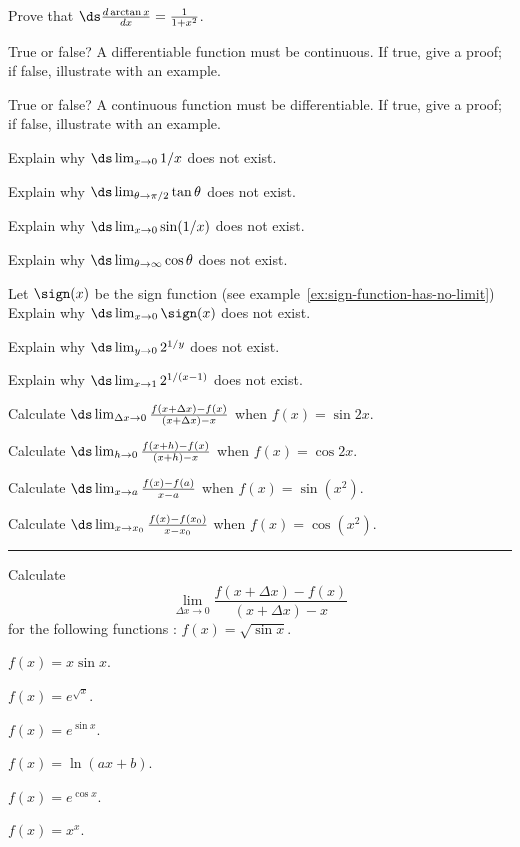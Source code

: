 \begin{multicols}{2}
  \problem Prove that $\ds \frac{d \arctan x }{ dx} = \frac{1}{ 1+x^2}$.


  \problem True or false? A differentiable function must be continuous.  If
  true, give a proof; if false, illustrate with an example.


  \problem True or false? A continuous function must be differentiable.  If
  true, give a proof; if false, illustrate with an example.


  \problem Explain why $\ds \lim_{x\to 0} 1/x $ does not exist.


  \problem Explain why $\ds \lim_{\theta\to \pi/2} \tan \theta $ does not
  exist.


  \problem Explain why $\ds \lim_{x\to 0} \sin(1/x)$ does not exist.


  \problem Explain why $\ds \lim_{\theta\to \infty} \cos \theta $ does not
  exist.


  \problem Let $\sign(x)$ be the sign function (see
  example~\ref{ex:sign-function-has-no-limit}) Explain why $\ds\lim_{x\to 0}
  \sign(x) $ does not exist.


  \problem Explain why $\ds \lim_{y\to 0} 2^{1/y}$ does not exist.


  \problem Explain why $\ds \lim_{x\to 1} 2^{1/(x-1)} $ does not exist.


  \problem Calculate $\ds\lim_{\Delta x\to 0} \frac{f(x+\Delta x)-f(x)}{ (x+\Delta x)-x } $ when $f(x) = \sin 2x$.


  \problem Calculate $\ds\lim_{h\to 0} \frac{f(x+h)-f(x)}{ (x+h)-x }$ when $f(x) = \cos 2x$.


  \problem Calculate $\ds \lim_{x\to a} \frac{f(x)-f(a)}{ x-a } $ when $f(x) = \sin(x^2)$.


  \problem Calculate $\ds \lim_{x\to x_0} \frac{f(x)-f(x_0)}{x-x_0} $ when $f(x) = \cos(x^2)$.

  \hrule

  Calculate 
  \[
  \lim_{\Delta x\to 0} \frac{f(x+\Delta x)-f(x)}{ (x+\Delta x)-x }
  \]
  for the following functions :
  \problem $f(x)= \sqrt{\sin x}$.


  \problem  $f(x) = x \sin x$.


  \problem  $f(x) = e^{\sqrt{x}}$.


  \problem  $f(x) = e^{\sin x}$.


  \problem  $f(x) = \ln (ax+b)$.


  \problem  $f(x) = e^{\cos x}$.


  \problem  $f(x) =x^x$.



\end{multicols}
